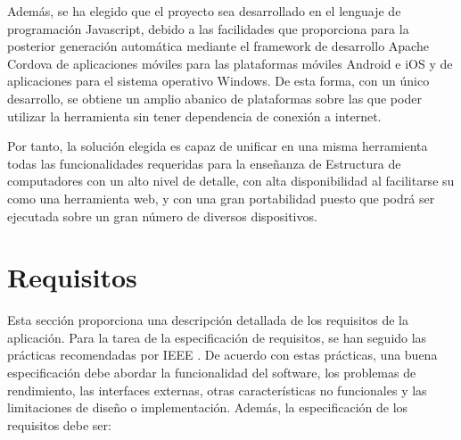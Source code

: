 Además, se ha elegido que el proyecto sea desarrollado en el lenguaje de programación Javascript, debido a las facilidades que proporciona para la posterior generación automática mediante el framework de desarrollo Apache Cordova de aplicaciones móviles para las plataformas móviles Android e iOS y de aplicaciones para el sistema operativo Windows. De esta forma, con un único desarrollo, se obtiene un amplio abanico de plataformas sobre las que poder utilizar la herramienta sin tener dependencia de conexión a internet.

Por tanto, la solución elegida es capaz de unificar en una misma herramienta todas las funcionalidades requeridas para la enseñanza de Estructura de computadores con un alto nivel de detalle, con alta disponibilidad al facilitarse su como una herramienta web, y con una gran portabilidad puesto que podrá ser ejecutada sobre un gran número de diversos dispositivos.


\section{Requisitos}
\label{sec:requirements}

Esta sección proporciona una descripción detallada de los requisitos de la aplicación. Para la tarea de la especificación de requisitos, se han seguido las prácticas recomendadas por IEEE \cite{ieee1998}. De acuerdo con estas prácticas, una buena especificación debe abordar la funcionalidad del software, los problemas de rendimiento, las interfaces externas, otras características no funcionales y las limitaciones de diseño o implementación.
Además, la especificación de los requisitos debe ser:

